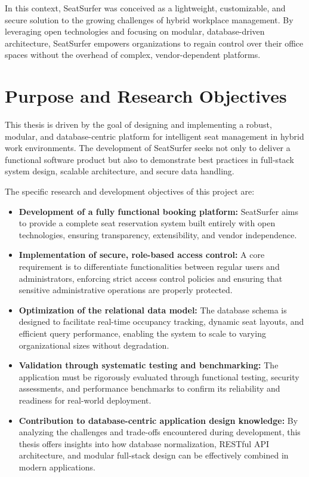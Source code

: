 \documentclass[12pt,a4paper]{report}
\begin{document}
In this context, SeatSurfer was conceived as a lightweight, customizable, and secure solution to the growing challenges of hybrid workplace management. By leveraging open technologies and focusing on modular, database-driven architecture, SeatSurfer empowers organizations to regain control over their office spaces without the overhead of complex, vendor-dependent platforms.

\section{Purpose and Research Objectives}

This thesis is driven by the goal of designing and implementing a robust, modular, and database-centric platform for intelligent seat management in hybrid work environments. The development of SeatSurfer seeks not only to deliver a functional software product but also to demonstrate best practices in full-stack system design, scalable architecture, and secure data handling.

The specific research and development objectives of this project are:

\begin{itemize}
    \item \textbf{Development of a fully functional booking platform:} SeatSurfer aims to provide a complete seat reservation system built entirely with open technologies, ensuring transparency, extensibility, and vendor independence.
    
    \item \textbf{Implementation of secure, role-based access control:} A core requirement is to differentiate functionalities between regular users and administrators, enforcing strict access control policies and ensuring that sensitive administrative operations are properly protected.
    
    \item \textbf{Optimization of the relational data model:} The database schema is designed to facilitate real-time occupancy tracking, dynamic seat layouts, and efficient query performance, enabling the system to scale to varying organizational sizes without degradation.
    
    \item \textbf{Validation through systematic testing and benchmarking:} The application must be rigorously evaluated through functional testing, security assessments, and performance benchmarks to confirm its reliability and readiness for real-world deployment.
    
    \item \textbf{Contribution to database-centric application design knowledge:} By analyzing the challenges and trade-offs encountered during development, this thesis offers insights into how database normalization, RESTful API architecture, and modular full-stack design can be effectively combined in modern applications.
\end{itemize}
\end{document}
